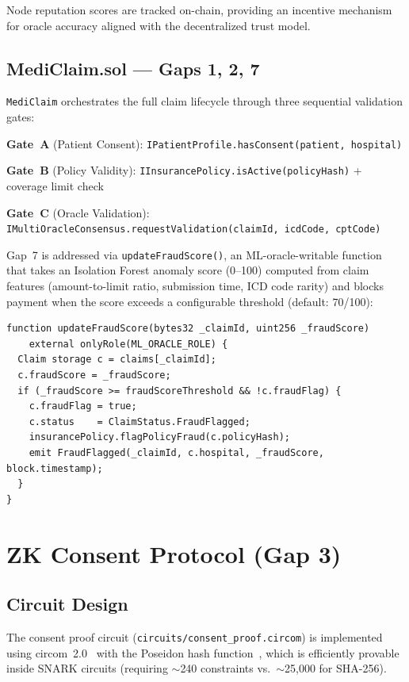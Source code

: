 \documentclass[journal]{IEEEtran}
\begin{document}
Node reputation scores are tracked on-chain, providing an incentive mechanism
for oracle accuracy aligned with the decentralized trust model.

\subsection{MediClaim.sol — Gaps 1, 2, 7}

\texttt{MediClaim} orchestrates the full claim lifecycle through three
sequential validation gates:

\textbf{Gate~A} (Patient Consent):
\verb|IPatientProfile.hasConsent(patient, hospital)|

\textbf{Gate~B} (Policy Validity):
\verb|IInsurancePolicy.isActive(policyHash)| + coverage limit check

\textbf{Gate~C} (Oracle Validation):
\verb|IMultiOracleConsensus.requestValidation(claimId, icdCode, cptCode)|

Gap~7 is addressed via \texttt{updateFraudScore()}, an ML-oracle-writable
function that takes an Isolation Forest anomaly score (0--100) computed from
claim features (amount-to-limit ratio, submission time, ICD code rarity)
and blocks payment when the score exceeds a configurable threshold (default:
70/100):

\begin{lstlisting}[language=Solidity,caption=ML Fraud Score Integration (Gap 7)]
function updateFraudScore(bytes32 _claimId, uint256 _fraudScore)
    external onlyRole(ML_ORACLE_ROLE) {
  Claim storage c = claims[_claimId];
  c.fraudScore = _fraudScore;
  if (_fraudScore >= fraudScoreThreshold && !c.fraudFlag) {
    c.fraudFlag = true;
    c.status    = ClaimStatus.FraudFlagged;
    insurancePolicy.flagPolicyFraud(c.policyHash);
    emit FraudFlagged(_claimId, c.hospital, _fraudScore, block.timestamp);
  }
}
\end{lstlisting}

\section{ZK Consent Protocol (Gap 3)}
\label{sec:zk}

\subsection{Circuit Design}

The consent proof circuit (\texttt{circuits/consent\_proof.circom}) is
implemented using circom~2.0~\cite{circom} with the Poseidon hash
function~\cite{poseidon}, which is efficiently provable inside SNARK circuits
(requiring $\sim$240 constraints vs.\ $\sim$25,000 for SHA-256).
\end{document}
